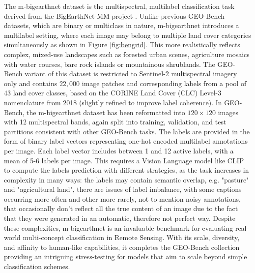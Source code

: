 \documentclass[a4paper, oneside, english]{sapthesis} %
\begin{document}
The m-bigearthnet dataset is the multispectral, multilabel classification task derived from the BigEarthNet-MM project \cite{sumbul2021bigearthnet}. Unlike previous GEO-Bench datasets, which are binary or multiclass in nature, m-bigearthnet introduces a multilabel setting, where each image may belong to multiple land cover categories simultaneously as shown in Figure \ref{fig:bengrid}. This more realistically reflects complex, mixed-use landscapes such as forested urban scenes, agriculture mosaics with water courses, bare rock islands or mountainous shrublands.
The GEO-Bench variant of this dataset is restricted to Sentinel-2 multispectral imagery only and contains $22,000$ image patches and corresponding labels from a pool of 43 land cover classes, based on the CORINE Land Cover (CLC) Level-3 nomenclature from 2018 (slightly refined to improve label coherence). In GEO-Bench, the m-bigearthnet dataset has been reformatted into $120\times 120$ images with 12 multispectral bands, again split into training, validation, and test partitions consistent with other GEO-Bench tasks. The labels are provided in the form of binary label vectors representing one-hot encoded multilabel annotations per image. Each label vector includes between 1 and 12 active labels, with a mean of 5-6 labels per image. This requires a Vision Language model like CLIP to compute the labels prediction with different strategies, as the task increases in complexity in many ways: the labels may contain semantic overlap, e.g. "pasture" and "agricultural land", there are issues of label imbalance, with some captions occurring more often and other more rarely, not to mention noisy annotations, that occasionally don't reflect all the true content of an image due to the fact that they were generated in an automatic, therefore not perfect way. Despite these complexities, m-bigearthnet is an invaluable benchmark for evaluating real-world multi-concept classification in Remote Sensing. With its scale, diversity, and affinity to human-like capabilities, it completes the GEO-Bench collection providing an intriguing stress-testing for models that aim to scale beyond simple classification schemes.
\end{document}
